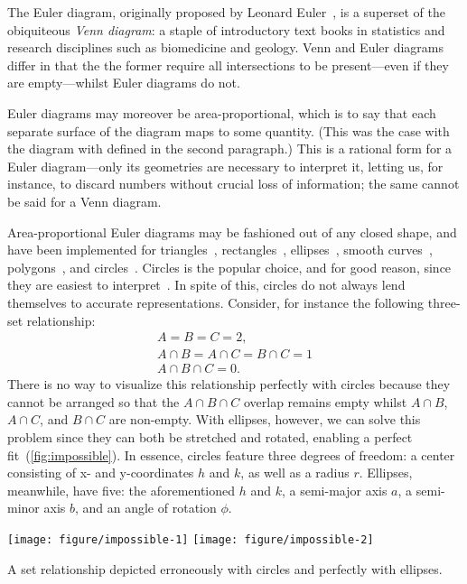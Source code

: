 \documentclass[
  oneside,
  openany,
  numbers=noendperiod,
  parskip=half,
  bibliography=totoc
]{scrbook}\usepackage[]{graphicx}\usepackage{xcolor}
\newenvironment{knitrout}{}{} %
\begin{document}
The Euler diagram, originally proposed by Leonard Euler~\citep{Euler_1802}, is
a superset of the obiquiteous \emph{Venn diagram}: a staple of introductory
text books in statistics and research disciplines such as biomedicine and
geology. Venn and Euler diagrams differ in that the the former require all
intersections to be present---even if they are empty---whilst Euler diagrams do
not.

Euler diagrams may moreover be area-proportional, which is to say that each separate
surface of the diagram maps to some quantity. (This was the case with
the diagram with defined in the second paragraph.) This is a rational form for a
Euler diagram---only its geometries are necessary to interpret it, letting us, for
instance, to discard numbers without crucial loss of information; the same
cannot be said for a Venn diagram.

Area-proportional Euler diagrams may be fashioned out of any closed shape, and
have been implemented for triangles~\citep{Swinton_2011},
rectangles~\citep{Swinton_2011}, ellipses~\citep{Micallef_2014a}, smooth
curves~\citep{Micallef_2014}, polygons~\citep{Swinton_2011}, and
circles~\citep{Wilkinson_2012,Kestler_2008,Swinton_2011}. Circles is the
popular choice, and for good reason, since they are easiest to
interpret~\citep{Blake_2016}. In spite of this, circles do not always lend
themselves to accurate representations. Consider, for instance the following
three-set relationship:
\[
\begin{gathered}
A = B = C = 2,\\
A \cap B = A \cap C = B \cap C = 1\\
A \cap B \cap C = 0.
\end{gathered}
\]
There is no way to visualize this relationship perfectly with circles because
they cannot be arranged so that the $A \cap B \cap C$ overlap remains empty whilst
$A \cap B$, $A \cap C$, and $B \cap C$ are non-empty. With ellipses, however,
we can solve this problem since they can both be stretched and rotated, enabling
a perfect fit~(\cref{fig:impossible}). In essence, circles
feature three degrees of freedom: a center consisting of x- and
y-coordinates $h$ and $k$, as well as a radius $r$. Ellipses, meanwhile, have
five: the aforementioned $h$ and $k$, a semi-major axis $a$, a semi-minor axis
$b$, and an angle of rotation $\phi$.

\begin{marginfigure}
\begin{knitrout}\small
{}\color{fgcolor}

{\centering \texttt{[image: figure/impossible-1]}
\texttt{[image: figure/impossible-2]}

}



\end{knitrout}
\caption{A set relationship depicted erroneously with circles and perfectly with
ellipses.}
\label{fig:impossible}
\end{marginfigure}
\end{document}
